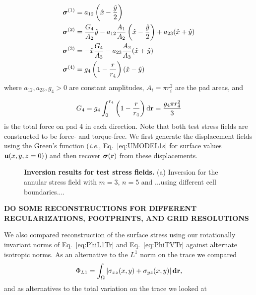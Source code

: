 \documentclass[aps,prl,reprint,twocolumn,groupedaddress,showpacs]{revtex4-1}
\newcommand{\bsigma}{{\boldsymbol\sigma}}
\def\d{{\bf d}}
\def\dd{\mbox{d}}
\def\r{{\bf r}}
\def\u{{\bf u}}
\begin{document}
\begin{align}
\bsigma^{(1)} & = a_{12}\left(\hat{x} -{\hat{y}\over 2}\right) \label{SIGMA1}\\
\bsigma^{(2)} & = {G_{4}\over A_{2}}\hat{y} - a_{12}{A_{1}\over A_{2}}\left(\hat{x} 
-{\hat{y}\over 2}\right) + a_{23}(\hat{x}+\hat{y}) \label{SIGMA2} \\
\bsigma^{(3)} & = -\hat{x}{G_{4}\over A_{3}} - a_{23}{A_{2}\over A_{3}}(\hat{x}+\hat{y}) 
\label{SIGMA3}\\
\bsigma^{(4)} & = g_{4}\left(1- {r \over r_{4}}\right)(\hat{x}-\hat{y})
\end{align}
%
where $a_{12}, a_{23}, g_{4} >0$ are constant amplitudes, 
$A_{i} = \pi r_{i}^{2}$ are the pad areas, and 

\begin{equation}
G_{4} = g_{4}\int_{0}^{r_{4}}\left(1-{r\over r_{4}}\right) \dd \r = {g_{4}\pi r_{4}^{2}\over 3}
\end{equation}
%
is the total force on pad 4 in each direction. Note that both test
stress fields are constructed to be force- and torque-free. We first
generate the displacement fields using the Green's function 
(\textit{i.e.}, Eq.~\ref{eq:UMODEL1s} for surface values $\u(x,y,z=0)$)
and then recover $\bsigma(\r)$ from these displacements.

\begin{figure}[t]
\begin{center}
%
\caption{\textbf{Inversion results for test stress fields.} (a)
  Inversion for the annular stress field with $m=3$, $n=5$ and
  ...using different cell boundaries.... }
\label{RESULTS_TEST}
\end{center}
\end{figure}

\vspace{1cm}
{\bf DO SOME RECONSTRUCTIONS FOR DIFFERENT REGULARIZATIONS, FOOTPRINTS, AND GRID RESOLUTIONS}
\vspace{1cm}

We also compared reconstruction of the surface stress using our
rotationally invariant norms of Eq.~\ref{eq:PhiL1Tr} and
Eq.~\ref{eq:PhiTVTr} against alternate isotropic norms. As an
alternative to the $L^1$ norm on the trace we compared
\begin{equation}
\Phi_{L1} = \int_\Omega \left\vert \sigma_{xz}(x,y) +\sigma_{yz}(x,y) \right\vert\d\r,
\end{equation} 
and as alternatives to the total variation on the trace we looked at
\end{document}
